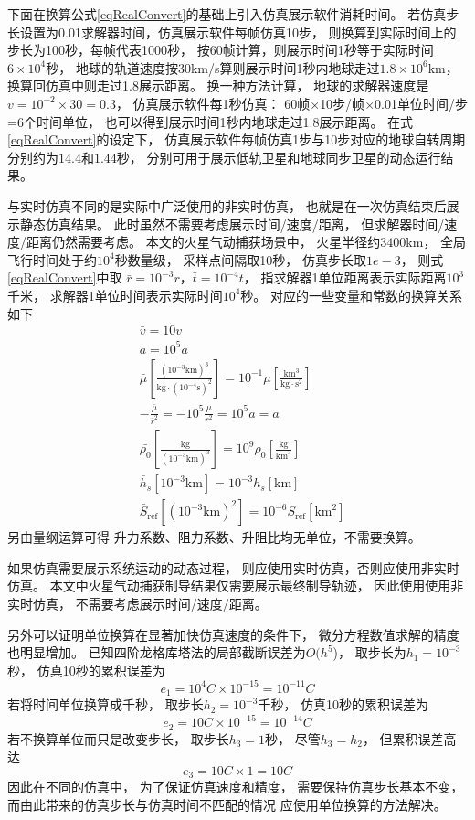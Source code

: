 下面在换算公式\eqref{eqRealConvert}的基础上引入仿真展示软件消耗时间。
若仿真步长设置为0.01求解器时间，仿真展示软件每帧仿真10步，
则换算到实际时间上的步长为100秒，每帧代表1000秒，
按60帧计算，则展示时间1秒等于实际时间$6\times10^4$秒，
地球的轨道速度按30km/s算则展示时间1秒内地球走过$1.8\times10^6$km，
换算回仿真中则走过1.8展示距离。
换一种方法计算，
地球的求解器速度是$\bar{v}=10^{-2}\times30=0.3$，
仿真展示软件每1秒仿真：
60帧$\times$10步/帧$\times$0.01单位时间/步=6个时间单位，
也可以得到展示时间1秒内地球走过1.8展示距离。
在式\eqref{eqRealConvert}的设定下，
仿真展示软件每帧仿真1步与10步对应的地球自转周期分别约为$14.4$和$1.44$秒，
分别可用于展示低轨卫星和地球同步卫星的动态运行结果。

与实时仿真不同的是实际中广泛使用的非实时仿真，
也就是在一次仿真结束后展示静态仿真结果。
此时虽然不需要考虑展示时间/速度/距离，
但求解器时间/速度/距离仍然需要考虑。
本文的火星气动捕获场景中，
火星半径约$3400$km，
全局飞行时间处于约$10^4$秒数量级，
采样点间隔取10秒，
仿真步长取$1e-3$，
则式\eqref{eqRealConvert}中取
$\bar{r}=10^{-3}r$，$\bar{t}=10^{-4}t$，
指求解器1单位距离表示实际距离$10^3$千米，
求解器1单位时间表示实际时间$10^4$秒。
对应的一些变量和常数的换算关系如下
\begin{align*}
    &\bar{v} = 10v \\
    &\bar{a} = 10^5a \\
    &\bar{\mu}\left[\frac{(10^{-3}\text{km})^3}{\text{kg}\cdot(10^{-4}\text{s})^2}\right]
     = 10^{-1}\mu\left[\frac{\text{km}^3}{\text{kg}\cdot \text{s}^2}\right] \\
    &-\frac{\bar{\mu}}{\bar{r}^2} = -10^5\frac{\mu}{r^2} = 10^5a = \bar{a} \\
    &\bar{\rho_0}\left[\frac{\text{kg}}{(10^{-3}\text{km})^3}\right]
    = 10^9\rho_0\left[\frac{\text{kg}}{\text{km}^3}\right] \\
    &\bar{h}_s[10^{-3}\text{km}] = 10^{-3}h_s[\text{km}] \\
    &\bar{S}_\text{ref}[(10^{-3}\text{km})^2] = 10^{-6}S_\text{ref}[\text{km}^2]
\end{align*}
另由量纲运算可得
升力系数、阻力系数、升阻比均无单位，不需要换算。

如果仿真需要展示系统运动的动态过程，
则应使用实时仿真，否则应使用非实时仿真。
本文中火星气动捕获制导结果仅需要展示最终制导轨迹，
因此使用使用非实时仿真，
不需要考虑展示时间/速度/距离。

另外可以证明单位换算在显著加快仿真速度的条件下，
微分方程数值求解的精度也明显增加。
已知四阶龙格库塔法的局部截断误差为$O(h^5$)\cite{mqingyang2019}，
取步长为$h_1=10^{-3}$秒，
仿真10秒的累积误差为
\[e_1=10^4C\times 10^{-15}=10^{-11}C\]
若将时间单位换算成千秒，
取步长$h_2=10^{-3}$千秒，
仿真10秒的累积误差为
\[e_2=10C\times 10^{-15}=10^{-14}C\]
若不换算单位而只是改变步长，
取步长$h_3=1$秒，
尽管$h_3=h_2$，
但累积误差高达
\[e_3=10C\times 1=10C\]
因此在不同的仿真中，
为了保证仿真速度和精度，
需要保持仿真步长基本不变，
而由此带来的仿真步长与仿真时间不匹配的情况
应使用单位换算的方法解决。
